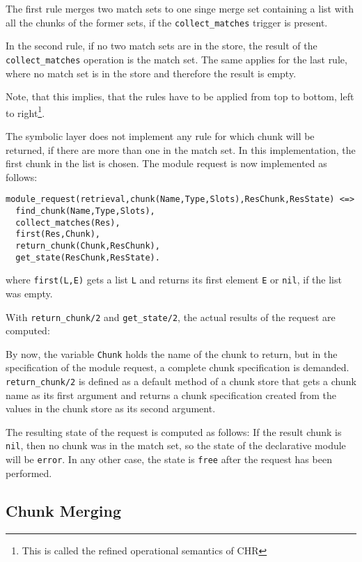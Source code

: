 The first rule merges two match sets to one singe merge set containing a list with all the chunks of the former sets, if the \verb|collect_matches| trigger is present. 

In the second rule, if no two match sets are in the store, the result of the \verb|collect_matches| operation is the match set. The same applies for the last rule, where no match set is in the store and therefore the result is empty.

Note, that this implies, that the rules have to be applied from top to bottom, left to right\footnote{This is called the refined operational semantics of CHR}.

The symbolic layer does not implement any rule for which chunk will be returned, if there are more than one in the match set. In this implementation, the first chunk in the list is chosen. The module request is now implemented as follows:

\begin{lstlisting}
module_request(retrieval,chunk(Name,Type,Slots),ResChunk,ResState) <=> 
  find_chunk(Name,Type,Slots),
  collect_matches(Res),
  first(Res,Chunk),
  return_chunk(Chunk,ResChunk),
  get_state(ResChunk,ResState).
\end{lstlisting}

where \verb|first(L,E)| gets a list \verb|L| and returns its first element \verb|E| or \verb|nil|, if the list was empty.

With \verb|return_chunk/2| and \verb|get_state/2|, the actual results of the request are computed:

By now, the variable \verb|Chunk| holds the name of the chunk to return, but in the specification of the module request, a complete chunk specification is demanded. \verb|return_chunk/2| is defined as a default method of a chunk store that gets a chunk name as its first argument and returns a chunk specification created from the values in the chunk store as its second argument.

The resulting state of the request is computed as follows: If the result chunk is \verb|nil|, then no chunk was in the match set, so the state of the declarative module will be \verb|error|. In any other case, the state is \verb|free| after the request has been performed.

\subsection{Chunk Merging}

